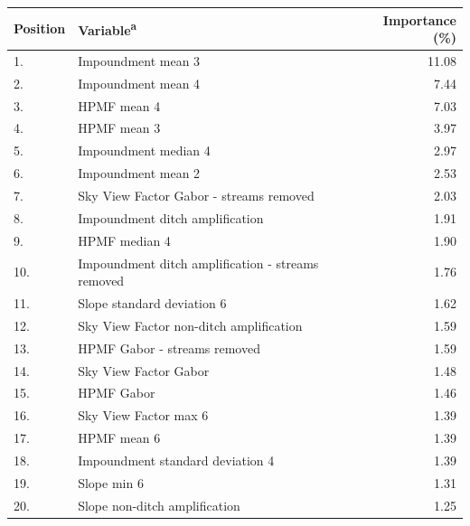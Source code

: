 \documentclass[]{interact}
\theoremstyle{plain}%
\theoremstyle{definition}
\theoremstyle{remark}
\begin{document}
\begin{table} [!htb]
        {\begin{tabular}{llr}
          \toprule
          Position & Variable\textsuperscript{a} & Importance (\%) \\ \midrule
          1.  & Impoundment mean 3                                  & 11.08\\
          2.  & Impoundment mean 4                                  & 7.44\\
          3.  & HPMF mean 4                                         & 7.03\\
          4.  & HPMF mean 3                                         & 3.97\\
          5.  & Impoundment median 4                                & 2.97\\
          6.  & Impoundment mean 2                                  & 2.53\\
          7.  & Sky View Factor Gabor - streams removed             & 2.03\\
          8.  & Impoundment ditch amplification                     & 1.91\\
          9.  & HPMF median 4                                       & 1.90\\
          10. & Impoundment ditch amplification - streams removed   & 1.76\\
          11. & Slope standard deviation 6                          & 1.62\\
          12. & Sky View Factor non-ditch amplification             & 1.59\\
          13. & HPMF Gabor - streams removed                        & 1.59\\
          14. & Sky View Factor Gabor                               & 1.48\\
          15. & HPMF Gabor                                          & 1.46\\
          16. & Sky View Factor max 6                               & 1.39\\
          17. & HPMF mean 6                                         & 1.39\\
          18. & Impoundment standard deviation 4                    & 1.39\\
          19. & Slope min 6                                         & 1.31\\
          20. & Slope non-ditch amplification                       & 1.25\\
          \bottomrule
        \end{tabular}}
    \label{featureimportancetable}
\end{table}
\end{document}
